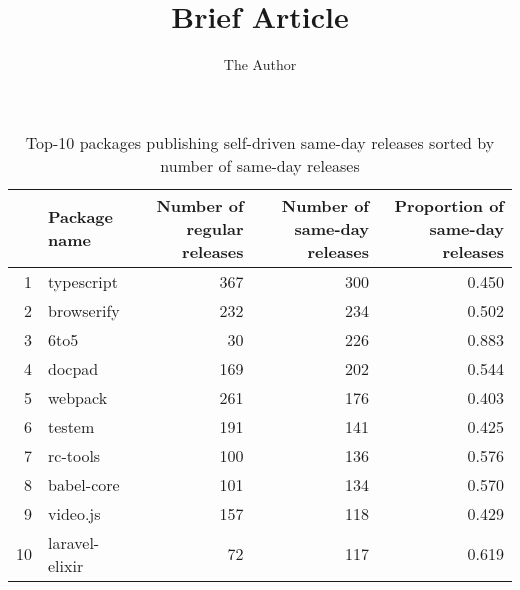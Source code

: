 \documentclass[11pt, oneside]{article}   	%
\title{Brief Article}
\author{The Author}
\begin{document}
\maketitle

\begin{table}[ht]
\centering
\begin{tabular}{rlrrr}
  \hline
 & \pbox{20cm}{Package \\name} & \pbox{20cm}{Number of \\regular releases} & \pbox{20cm}{Number of \\same-day releases} & \pbox{20cm}{Proportion of \\same-day releases} \\ 
  \hline
1 & typescript & 367 & 300 & 0.450 \\ 
  2 & browserify & 232 & 234 & 0.502 \\ 
  3 & 6to5 & 30 & 226 & 0.883 \\ 
  4 & docpad & 169 & 202 & 0.544 \\ 
  5 & webpack & 261 & 176 & 0.403 \\ 
  6 & testem & 191 & 141 & 0.425 \\ 
  7 & rc-tools & 100 & 136 & 0.576 \\ 
  8 & babel-core & 101 & 134 & 0.570 \\ 
  9 & video.js & 157 & 118 & 0.429 \\ 
  10 & laravel-elixir & 72 & 117 & 0.619 \\ 
   \hline
\end{tabular}
\caption{Top-10 packages publishing self-driven same-day releases sorted by number of same-day releases} 
\end{table}
\end{document}
